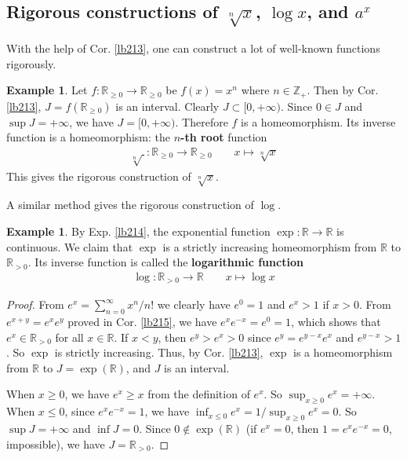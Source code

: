 \documentclass[12pt,b5paper,notitlepage]{article}
\theoremstyle{definition}
\newtheorem{eg}[df]{Example}
\theoremstyle{plain}
\newcommand{\Zbb}{\mathbb Z}
\newcommand{\Rbb}{\mathbb R}
\numberwithin{equation}{section}
\begin{document}





\subsection{Rigorous constructions of $\sqrt[n]{x}$, $\log x$, and $a^x$}\label{lb219}


With the help of Cor. \ref{lb213}, one can construct a lot of well-known functions rigorously. 



\begin{eg}\label{lb216}
Let $f:\Rbb_{\geq0}\rightarrow\Rbb_{\geq0}$ be $f(x)=x^n$ where $n\in\Zbb_+$. Then by Cor. \ref{lb213}, $J=f(\Rbb_{\geq 0})$ is an interval. Clearly $J\subset[0,+\infty)$. Since $0\in J$ and $\sup J=+\infty$, we have $J=[0,+\infty)$. Therefore $f$ is a homeomorphism. Its inverse function is a homeomorphism: the \textbf{$n$-th root} function
\begin{gather*}
\sqrt[n]{~}:\Rbb_{\geq0}\rightarrow\Rbb_{\geq0} \qquad x\mapsto\sqrt[n]x
\end{gather*}
This gives the rigorous construction of $\sqrt[n]{x}$.
\end{eg}

A similar method gives the rigorous construction of $\log$. 
\begin{eg}\label{lb217}
By Exp. \ref{lb214}, the exponential function $\exp:\Rbb\rightarrow\Rbb$ is continuous. We claim that $\exp$ is a strictly increasing homeomorphism from $\Rbb$ to $\Rbb_{>0}$. Its inverse function is called the \textbf{logarithmic function}  
\begin{align*}
\log:\Rbb_{>0}\rightarrow\Rbb \qquad x\mapsto \log x
\end{align*}
\end{eg}

\begin{proof}
From $e^x=\sum_{n=0}^\infty x^n/n!$ we clearly have $e^0=1$ and $e^x>1$ if $x>0$. From $e^{x+y}=e^xe^y$ proved in Cor. \ref{lb215}, we have $e^xe^{-x}=e^0=1$, which shows that $e^x\in\Rbb_{>0}$ for all $x\in\Rbb$. If $x<y$, then $e^y>e^x>0$ since $e^y=e^{y-x}e^x$ and $e^{y-x}>1$. So $\exp$ is strictly increasing. Thus, by Cor. \ref{lb213}, $\exp$ is a homeomorphism from $\Rbb$ to $J=\exp(\Rbb)$, and $J$ is an interval. 

When $x\geq 0$, we have $e^x\geq x$ from the definition of $e^x$. So $\sup_{x\geq 0}e^x=+\infty$. When $x\leq 0$, since $e^xe^{-x}=1$, we have $\inf_{x\leq 0}e^x=1/\sup_{x\geq 0}e^x=0$. So $\sup J=+\infty$ and $\inf J=0$. Since $0\notin\exp(\Rbb)$ (if $e^x=0$, then $1=e^xe^{-x}=0$, impossible), we have $J=\Rbb_{>0}$.
\end{proof}
\end{document}
